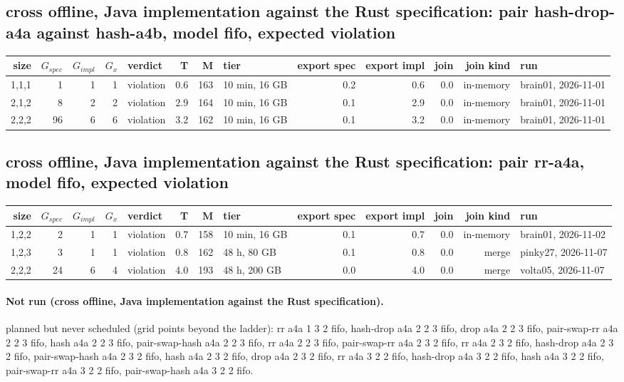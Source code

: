 \documentclass[10pt]{article}
\begin{document}
\subsection*{cross offline, Java implementation against the Rust specification: pair \textsf{hash-drop-a4a} against \textsf{hash-a4b}, model fifo, expected violation}
\begin{longtable}{@{}rrrrlrrlrrrrl@{}}
\toprule
size & $G_{\mathit{spec}}$ & $G_{\mathit{impl}}$ & $G_x$ & verdict & T & M & tier & export spec & export impl & join & join kind & run \\
\midrule
\endhead
\color{red} 1,1,1 & 1 & 1 & 1 & violation & 0.6 & 163 & 10 min, 16 GB & 0.2 & 0.6 & 0.0 & in-memory & brain01, 2026-11-01 \\
\color{red} 2,1,2 & 8 & 2 & 2 & violation & 2.9 & 164 & 10 min, 16 GB & 0.1 & 2.9 & 0.0 & in-memory & brain01, 2026-11-01 \\
\color{red} 2,2,2 & 96 & 6 & 6 & violation & 3.2 & 162 & 10 min, 16 GB & 0.1 & 3.2 & 0.0 & in-memory & brain01, 2026-11-01 \\
\bottomrule
\end{longtable}
\subsection*{cross offline, Java implementation against the Rust specification: pair \textsf{rr-a4a}, model fifo, expected violation}
\begin{longtable}{@{}rrrrlrrlrrrrl@{}}
\toprule
size & $G_{\mathit{spec}}$ & $G_{\mathit{impl}}$ & $G_x$ & verdict & T & M & tier & export spec & export impl & join & join kind & run \\
\midrule
\endhead
\color{red} 1,2,2 & 2 & 1 & 1 & violation & 0.7 & 158 & 10 min, 16 GB & 0.1 & 0.7 & 0.0 & in-memory & brain01, 2026-11-02 \\
\color{red} 1,2,3 & 3 & 1 & 1 & violation & 0.8 & 162 & 48 h, 80 GB & 0.1 & 0.8 & 0.0 & merge & pinky27, 2026-11-07 \\
\color{red} 2,2,2 & 24 & 6 & 4 & violation & 4.0 & 193 & 48 h, 200 GB & 0.0 & 4.0 & 0.0 & merge & volta05, 2026-11-07 \\
\bottomrule
\end{longtable}
\paragraph{Not run (cross offline, Java implementation against the Rust specification).}
planned but never scheduled (grid points beyond the ladder): rr a4a 1 3 2 fifo, hash-drop a4a 2 2 3 fifo, drop a4a 2 2 3 fifo, pair-swap-rr a4a 2 2 3 fifo, hash a4a 2 2 3 fifo, pair-swap-hash a4a 2 2 3 fifo, rr a4a 2 2 3 fifo, pair-swap-rr a4a 2 3 2 fifo, rr a4a 2 3 2 fifo, hash-drop a4a 2 3 2 fifo, pair-swap-hash a4a 2 3 2 fifo, hash a4a 2 3 2 fifo, drop a4a 2 3 2 fifo, rr a4a 3 2 2 fifo, hash-drop a4a 3 2 2 fifo, hash a4a 3 2 2 fifo, pair-swap-rr a4a 3 2 2 fifo, pair-swap-hash a4a 3 2 2 fifo.\par
\end{document}
